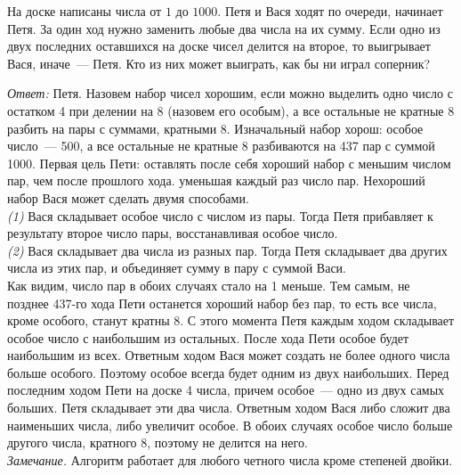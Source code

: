 \problem
{}
На доске написаны числа от $1$ до $1000$.
Петя и Вася ходят по очереди, начинает Петя.
За один ход нужно заменить любые два числа на их сумму.
Если одно из двух последних оставшихся на доске чисел делится на второе, то
выигрывает Вася, иначе~--- Петя.
Кто из них может выиграть, как бы ни играл соперник?

\solution
\emph{Ответ:} Петя.
Назовем набор чисел хорошим, если можно выделить одно число с остатком 4 при
делении на 8 (назовем его особым), а все остальные не кратные 8 разбить на пары
с суммами, кратными 8.
Изначальный набор хорош: особое число~--- 500, а все остальные не кратные 8
разбиваются на 437 пар с суммой 1000.
Первая цель Пети: оставлять после себя хороший набор с меньшим числом пар, чем
после прошлого хода. уменьшая каждый раз число пар.
Нехороший набор Вася может сделать двумя способами.
\\\emph{(1)}
Вася складывает особое число с числом из пары.
Тогда Петя прибавляет к результату второе число пары, восстанавливая особое
число.
\\\emph{(2)}
Вася складывает два числа из разных пар.
Тогда Петя складывает два других числа из этих пар, и объединяет сумму в пару с
суммой Васи.
\\
Как видим, число пар в обоих случаях стало на 1 меньше.
Тем самым, не позднее 437-го хода Пети останется хороший набор без пар, то есть
все числа, кроме особого, станут кратны 8.
С этого момента Петя каждым ходом складывает особое число с наибольшим из
остальных.
После хода Пети особое будет наибольшим из всех.
Ответным ходом Вася может создать не более одного числа больше особого.
Поэтому особое всегда будет одним из двух наибольших.
Перед последним ходом Пети на доске 4 числа, причем особое~--- одно из двух
самых больших.
Петя складывает эти два числа.
Ответным ходом Вася либо сложит два наименьших числа, либо увеличит особое.
В обоих случаях особое число больше другого числа, кратного 8, поэтому не
делится на него.
\\
\emph{Замечание.}
Алгоритм работает для любого четного числа кроме степеней двойки.

\endproblem
